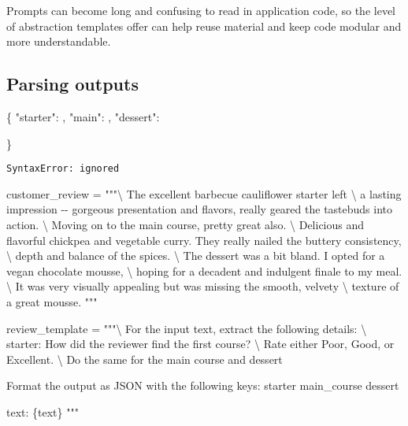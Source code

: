 \documentclass[
  letterpaper,
  DIV=11,
  numbers=noendperiod]{scrreprt}
\newenvironment{Shaded}{\begin{snugshade}}{\end{snugshade}}
\newcommand{\CharTok}[1]{\textcolor[rgb]{0.13,0.47,0.30}{#1}}
\newcommand{\NormalTok}[1]{\textcolor[rgb]{0.00,0.23,0.31}{#1}}
\newcommand{\OperatorTok}[1]{\textcolor[rgb]{0.37,0.37,0.37}{#1}}
\newcommand{\SpecialCharTok}[1]{\textcolor[rgb]{0.37,0.37,0.37}{#1}}
\newcommand{\StringTok}[1]{\textcolor[rgb]{0.13,0.47,0.30}{#1}}
\begin{document}
Prompts can become long and confusing to read in application code, so
the level of abstraction templates offer can help reuse material and
keep code modular and more understandable.

\hypertarget{parsing-outputs}{%
\subsection{Parsing outputs}\label{parsing-outputs}}

\begin{Shaded}
\begin{Highlighting}[]
\NormalTok{\{}
 \StringTok{"starter"}\NormalTok{: ,}
 \StringTok{"main"}\NormalTok{: ,}
 \StringTok{"dessert"}\NormalTok{:}

\NormalTok{\}}
\end{Highlighting}
\end{Shaded}

\begin{verbatim}
SyntaxError: ignored
\end{verbatim}

\begin{Shaded}
\begin{Highlighting}[]
\NormalTok{customer\_review }\OperatorTok{=} \StringTok{"""}\CharTok{\textbackslash{}}
\StringTok{The excellent barbecue cauliflower starter left }\CharTok{\textbackslash{}}
\StringTok{a lasting impression {-}{-} gorgeous presentation and flavors, really geared the tastebuds into action. }\CharTok{\textbackslash{}}
\StringTok{Moving on to the main course, pretty great also. }\CharTok{\textbackslash{}}
\StringTok{Delicious and flavorful chickpea and vegetable curry. They really nailed the buttery consistency, }\CharTok{\textbackslash{}}
\StringTok{depth and balance of the spices. }\CharTok{\textbackslash{}}
\StringTok{The dessert was a bit bland. I opted for a vegan chocolate mousse, }\CharTok{\textbackslash{}}
\StringTok{hoping for a decadent and indulgent finale to my meal. }\CharTok{\textbackslash{}}
\StringTok{It was very visually appealing but was missing the smooth, velvety }\CharTok{\textbackslash{}}
\StringTok{texture of a great mousse.}
\StringTok{"""}

\NormalTok{review\_template }\OperatorTok{=} \StringTok{"""}\CharTok{\textbackslash{}}
\StringTok{For the input text, extract the following details: }\CharTok{\textbackslash{}}
\StringTok{starter: How did the reviewer find the first course? }\CharTok{\textbackslash{}}
\StringTok{Rate either Poor, Good, or Excellent. }\CharTok{\textbackslash{}}
\StringTok{Do the same for the main course and dessert}

\StringTok{Format the output as JSON with the following keys:}
\StringTok{starter}
\StringTok{main\_course}
\StringTok{dessert}

\StringTok{text: }\SpecialCharTok{\{text\}}
\StringTok{"""}

\end{Highlighting}
\end{Shaded}
\end{document}

